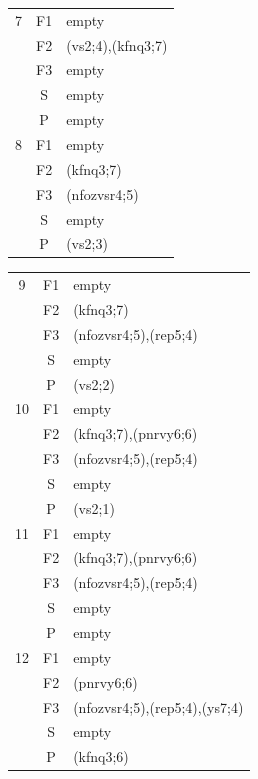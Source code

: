 \documentclass[12pt]{article}
\begin{document}
{\begin{tabular}{|c|c|l|}
		7 & F1 & empty\\ 
		\cline{2-3}
		& F2 & (vs2;4),(kfnq3;7)\\
		\cline{2-3}
		& F3 & empty\\
		\cline{2-3}
		& S & empty\\
		\cline{2-3}
		& P & empty\\
		\hline
		
		8 & F1 & empty\\ 
		\cline{2-3}
		& F2 & (kfnq3;7)\\
		\cline{2-3}
		& F3 & (nfozvsr4;5)\\
		\cline{2-3}
		& S & empty\\
		\cline{2-3}
		& P & (vs2;3)\\
		\hline
	\end{tabular}
	
	\begin{tabular}{|c|c|l|}
		\hline
		9 & F1 & empty\\ 
		\cline{2-3}
		& F2 & (kfnq3;7)\\
		\cline{2-3}
		& F3 & (nfozvsr4;5),(rep5;4)\\
		\cline{2-3}
		& S & empty\\
		\cline{2-3}
		& P & (vs2;2)\\
		\hline
	
		10 & F1 & empty\\ 
		\cline{2-3}
		& F2 & (kfnq3;7),(pnrvy6;6)\\
		\cline{2-3}
		& F3 & (nfozvsr4;5),(rep5;4)\\
		\cline{2-3}
		& S & empty\\
		\cline{2-3}
		& P & (vs2;1)\\
		\hline
		
		11 & F1 & empty\\ 
		\cline{2-3}
		& F2 & (kfnq3;7),(pnrvy6;6)\\
		\cline{2-3}
		& F3 & (nfozvsr4;5),(rep5;4)\\
		\cline{2-3}
		& S & empty\\
		\cline{2-3}
		& P & empty\\
		\hline
		
		12 & F1 & empty\\ 
		\cline{2-3}
		& F2 & (pnrvy6;6)\\
		\cline{2-3}
		& F3 & (nfozvsr4;5),(rep5;4),(ys7;4)\\
		\cline{2-3}
		& S & empty\\
		\cline{2-3}
		& P & (kfnq3;6)\\
		\hline
		

\end{tabular}}
\end{document}
